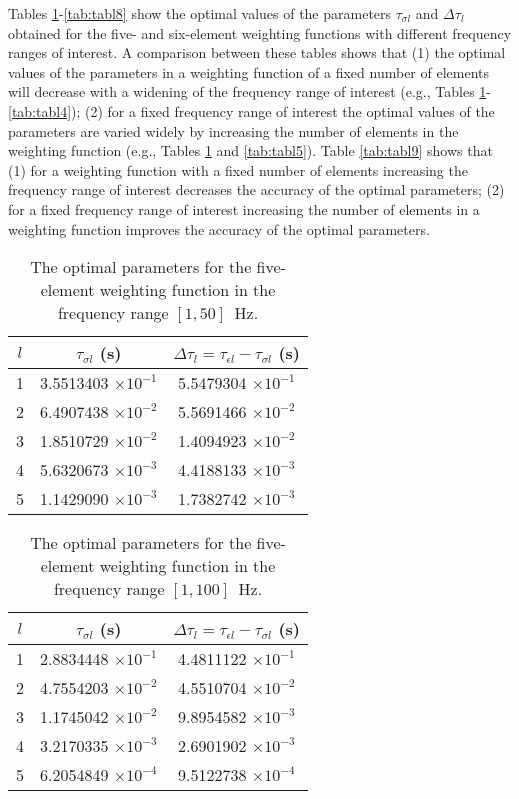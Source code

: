 \documentclass[article]{./macros/elsarticle_qh}
\begin{document}
Tables \ref{tab:tabl1}-\ref{tab:tabl8} show the optimal values of the parameters $\tau_{\sigma l}$ and $\Delta \tau_l$ obtained for the five- and six-element weighting functions with different frequency ranges of interest. A comparison between these tables shows that (1) the optimal values of the parameters in a weighting function of a fixed number of elements will decrease with a widening of the frequency range of interest (e.g., Tables \ref{tab:tabl1}-\ref{tab:tabl4}); (2) for a fixed frequency range of interest the optimal values of the parameters are varied widely by increasing the number of elements in the weighting function (e.g., Tables \ref{tab:tabl1} and \ref{tab:tabl5}).
Table \ref{tab:tabl9} shows that (1) for a weighting function with a fixed number of elements increasing the frequency range of interest decreases the accuracy of the optimal parameters; (2) for a fixed frequency range of interest increasing the number of elements in a weighting function improves the accuracy of the optimal parameters.

\begin{table}[H]
\centering
\caption{The optimal parameters for the five-element weighting function in the frequency range $[1,50]$~Hz.}
\label{tab:tabl1}
\begin{tabular}{c c c}
\toprule
$l$ & $\tau_{\sigma l}$ (s) & $\Delta \tau_{l} = \tau_{\epsilon l}-\tau_{\sigma l}$ (s) \\
\midrule
1 &	3.5513403 $\times 10^{-1}$ &	5.5479304 $\times 10^{-1}$ \\
2 &	6.4907438 $\times 10^{-2}$ &	5.5691466 $\times 10^{-2}$ \\
3 &	1.8510729 $\times 10^{-2}$ &	1.4094923 $\times 10^{-2}$ \\
4 &	5.6320673 $\times 10^{-3}$ &	4.4188133 $\times 10^{-3}$ \\
5 &	1.1429090 $\times 10^{-3}$ &	1.7382742 $\times 10^{-3}$ \\
\bottomrule   
\end{tabular}
\end{table}

\begin{table}[H]
\centering
\caption{The optimal parameters for the five-element weighting function in the frequency range $[1,100]$~Hz.}
\label{tab:tabl2}
\begin{tabular}{c c c}
\toprule
$l$ & $\tau_{\sigma l}$ (s) & $\Delta \tau_{l} = \tau_{\epsilon l}-\tau_{\sigma l}$ (s) \\
\midrule
1 &	2.8834448 $\times 10^{-1}$ &	4.4811122 $\times 10^{-1}$ \\
2 &	4.7554203 $\times 10^{-2}$ &	4.5510704 $\times 10^{-2}$ \\
3 &	1.1745042 $\times 10^{-2}$ &	9.8954582 $\times 10^{-3}$ \\
4 &	3.2170335 $\times 10^{-3}$ &	2.6901902 $\times 10^{-3}$ \\
5 &	6.2054849 $\times 10^{-4}$ &	9.5122738 $\times 10^{-4}$ \\
\bottomrule     
\end{tabular}
\end{table}
\end{document}
